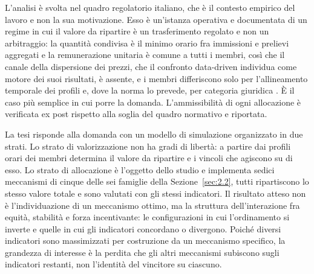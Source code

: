 L'analisi è svolta nel quadro regolatorio italiano, che è il contesto empirico del lavoro e non la sua motivazione. Esso è un'istanza operativa e documentata di un regime in cui il valore da ripartire è un trasferimento regolato e non un arbitraggio: la quantità condivisa è il minimo orario fra immissioni e prelievi aggregati e la remunerazione unitaria è comune a tutti i membri, così che il canale della dispersione dei prezzi, che il confronto data-driven individua come motore dei suoi risultati, è assente, e i membri differiscono solo per l'allineamento temporale dei profili e, dove la norma lo prevede, per categoria giuridica \cite{MASE:Decreto:CER:2023, GSE:CACER:RegoleOperative:2025}. È il caso più semplice in cui porre la domanda. L'ammissibilità di ogni allocazione è verificata ex post rispetto alla soglia del quadro normativo e riportata.

La tesi risponde alla domanda con un modello di simulazione organizzato in due strati. Lo strato di valorizzazione non ha gradi di libertà: a partire dai profili orari dei membri determina il valore da ripartire e i vincoli che agiscono su di esso. Lo strato di allocazione è l'oggetto dello studio e implementa sedici meccanismi di cinque delle sei famiglie della Sezione~\ref{sec:2.2}, tutti ripartiscono lo stesso valore totale e sono valutati con gli stessi indicatori. Il risultato atteso non è l'individuazione di un meccanismo ottimo, ma la struttura dell'interazione fra equità, stabilità e forza incentivante: le configurazioni in cui l'ordinamento si inverte e quelle in cui gli indicatori concordano o divergono. Poiché diversi indicatori sono massimizzati per costruzione da un meccanismo specifico, la grandezza di interesse è la perdita che gli altri meccanismi subiscono sugli indicatori restanti, non l'identità del vincitore su ciascuno.
